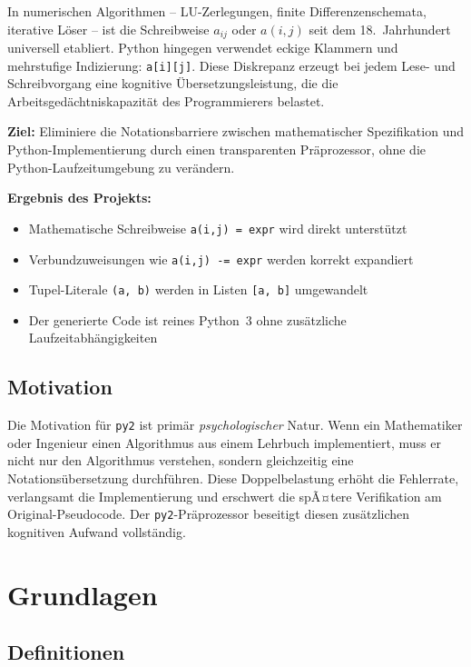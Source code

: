 ﻿\documentclass[a4paper,12pt]{article}
\theoremstyle{definition}
\begin{document}
In numerischen Algorithmen -- LU-Zerlegungen, finite Differenzenschemata, iterative
L\"oser -- ist die Schreibweise $a_{ij}$ oder $a(i,j)$ seit dem 18.\ Jahrhundert
universell etabliert. Python hingegen verwendet eckige Klammern und mehrstufige
Indizierung: \texttt{a[i][j]}. Diese Diskrepanz erzeugt bei jedem Lese- und
Schreibvorgang eine kognitive \"Ubersetzungsleistung, die die Arbeitsged\"achtniskapazit\"at
des Programmierers belastet.

\textbf{Ziel:} Eliminiere die Notationsbarriere zwischen mathematischer Spezifikation
und Python-Implementierung durch einen transparenten Pr\"aprozessor, ohne die
Python-Laufzeitumgebung zu ver\"andern.

\textbf{Ergebnis des Projekts:}
\begin{itemize}
	\item Mathematische Schreibweise \texttt{a(i,j) = expr} wird direkt unterst\"utzt
	\item Verbundzuweisungen wie \texttt{a(i,j) -= expr} werden korrekt expandiert
	\item Tupel-Literale \texttt{(a, b)} werden in Listen \texttt{[a, b]} umgewandelt
	\item Der generierte Code ist reines Python~3 ohne zus\"atzliche Laufzeitabh\"angigkeiten
\end{itemize}

\subsection{Motivation}

Die Motivation f\"ur \texttt{py2} ist prim\"ar \emph{psychologischer} Natur. Wenn ein
Mathematiker oder Ingenieur einen Algorithmus aus einem Lehrbuch implementiert, muss
er nicht nur den Algorithmus verstehen, sondern gleichzeitig eine Notations\"ubersetzung
durchf\"uhren. Diese Doppelbelastung erh\"oht die Fehlerrate, verlangsamt die Implementierung
und erschwert die spÃ¤tere Verifikation am Original-Pseudocode. Der \texttt{py2}-Pr\"aprozessor
beseitigt diesen zus\"atzlichen kognitiven Aufwand vollst\"andig.

\section{Grundlagen}

\subsection{Definitionen}
\end{document}
